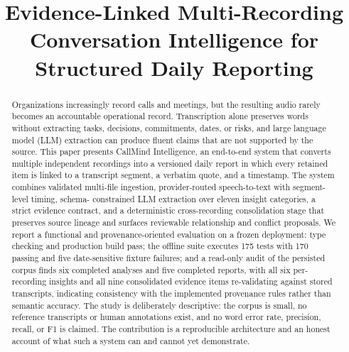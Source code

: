 \documentclass[conference,a4paper]{IEEEtran}
\begin{document}


\title{Evidence-Linked Multi-Recording Conversation Intelligence for Structured Daily Reporting}

\author{
\and
{}
}

\maketitle

\begin{abstract}
Organizations increasingly record calls and meetings, but the resulting audio rarely
becomes an accountable operational record. Transcription alone preserves words without
extracting tasks, decisions, commitments, dates, or risks, and large language model (LLM)
extraction can produce fluent claims that are not supported by the source. This paper
presents CallMind Intelligence, an end-to-end system that converts multiple independent
recordings into a versioned daily report in which every retained item is linked to a
transcript segment, a verbatim quote, and a timestamp. The system combines validated
multi-file ingestion, provider-routed speech-to-text with segment-level timing, schema-
constrained LLM extraction over eleven insight categories, a strict evidence contract, and
a deterministic cross-recording consolidation stage that preserves source lineage and
surfaces reviewable relationship and conflict proposals. We report a functional and
provenance-oriented evaluation on a frozen deployment: type checking and production build
pass; the offline suite executes 175 tests with 170 passing and five date-sensitive
fixture failures; and a read-only audit of the persisted corpus finds six completed
analyses and five completed reports, with all six per-recording insights and all nine
consolidated evidence items re-validating against stored transcripts, indicating
consistency with the implemented provenance rules rather than semantic accuracy. The study is
deliberately descriptive: the corpus is small, no reference transcripts or human
annotations exist, and no word error rate, precision, recall, or F1 is claimed. The
contribution is a reproducible architecture and an honest account of what such a system
can and cannot yet demonstrate.
\end{abstract}
\end{document}
